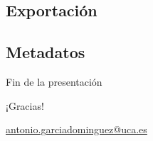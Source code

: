 \documentclass[xcolor=svgnames]{beamer}
\begin{document}
\subsection{Exportación}

\subsection{Metadatos}

\appendix

\begin{frame}{Fin de la presentación}
  \begin{center}
    {\Huge ¡Gracias!}

    \vspace{3em}

    {\Large
      \href{mailto:antonio.garciadominguez@uca.es}{antonio.garciadominguez@uca.es}}
  \end{center}
\end{frame}
\end{document}
